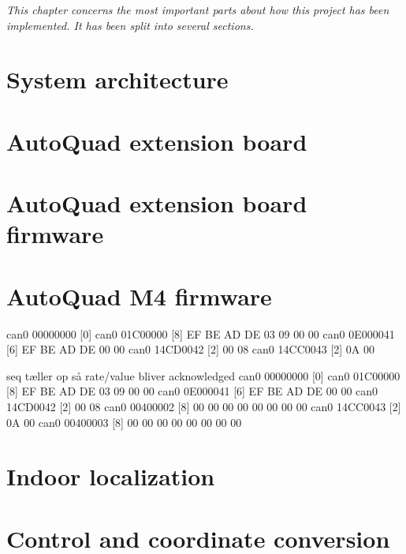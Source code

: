 \textit{This chapter concerns the most important parts about how this project has been implemented. It has been split into several sections.}

\newpage
\section{System architecture}

\newpage

\section{AutoQuad extension board}

\newpage

\section{AutoQuad extension board firmware}


\newpage
\section{AutoQuad M4 firmware}


\newpage
%



  can0  00000000   [0] 
  can0  01C00000   [8]  EF BE AD DE 03 09 00 00
  can0  0E000041   [6]  EF BE AD DE 00 00
  can0  14CD0042   [2]  00 08
  can0  14CC0043   [2]  0A 00



seq tæller op så rate/value bliver acknowledged
  can0  00000000   [0] 
  can0  01C00000   [8]  EF BE AD DE 03 09 00 00
  can0  0E000041   [6]  EF BE AD DE 00 00
  can0  14CD0042   [2]  00 08
  can0  00400002   [8]  00 00 00 00 00 00 00 00
  can0  14CC0043   [2]  0A 00
  can0  00400003   [8]  00 00 00 00 00 00 00 00



\section{Indoor localization} \label{sec:indoor_localization}


\section{Control and coordinate conversion}
\label{sec:control_and_coordinate_conversion}


